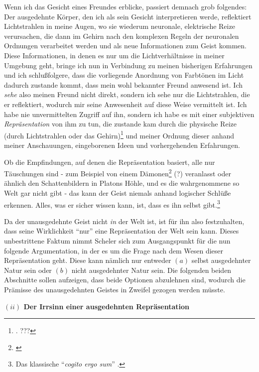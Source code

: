\documentclass[a4paper, 12pt]{article}
\begin{document}
\begin{onehalfspace}
Wenn ich das Gesicht eines Freundes erblicke, passiert demnach grob folgendes: Der ausgedehnte Körper, den ich als sein Gesicht interpretieren werde, reflektiert Lichtstrahlen in meine Augen, wo sie wiederum neuronale, elektrische Reize verursachen, die dann im Gehirn nach den komplexen Regeln der neuronalen Ordnungen verarbeitet werden und als neue Informationen zum Geist kommen. Diese Informationen, in denen es nur um die Lichtverhältnisse in meiner Umgebung geht, bringe ich nun in Verbindung zu meinen bisherigen Erfahrungen und ich schlußfolgere, dass die vorliegende Anordnung von Farbtönen im Licht dadurch zustande kommt, dass mein wohl bekannter Freund anwesend ist. Ich \emph{sehe} also meinen Freund nicht direkt, sondern ich sehe nur die Lichtstrahlen, die er reflektiert, wodurch mir seine Anwesenheit auf diese Weise vermittelt ist. Ich habe nie unvermittelten Zugriff auf ihn, sondern ich habe es mit einer subjektiven \emph{Repräsentation} von ihm zu tun, die zustande kam durch die physische Reize (durch Lichtstrahlen oder das Gehirn)\footnote{\Cite[Vgl.][S. 270f.]{scheler-idole}. ???} und meiner Ordnung dieser anhand meiner Anschauungen, eingeborenen Ideen und vorhergehenden Erfahrungen. 

Ob die Empfindungen, auf denen die Repräsentation basiert, alle nur Täuschungen sind - zum Beispiel von einem Dämonen\footnote{\Cite[Vgl.][S.?]{descartes}} (?) veranlasst oder ähnlich den Schattenbildern in Platons Höhle, und es die wahrgenommene so Welt gar nicht gibt - das kann der Geist niemals anhand logischer Schlüße erkennen. Alles, was er sicher wissen kann, ist, dass es ihn selbst gibt.\footnote{Das klassische "`\emph{cogito ergo sum}"' .} 


Da der unausgedehnte Geist nicht \emph{in} der Welt ist, ist für ihn also festzuhalten, dass seine Wirklichkeit "`nur"' eine Repräsentation der Welt sein kann. Dieses unbestrittene Faktum nimmt Scheler sich zum Ausgangspunkt für die nun folgende Argumentation, in der es um die Frage nach dem Wesen dieser Repräsentation geht. Diese kann nämlich nur entweder $(a)$ selbst ausgedehnter Natur sein oder $(b)$ nicht ausgedehnter Natur sein. Die folgenden beiden Abschnitte sollen aufzeigen, dass beide Optionen abzulehnen sind, wodurch die Prämisse des unausgedehnten Geistes in Zweifel gezogen werden müsste.

\vspace{5mm}
\noindent\textbf{$(ii)$ Der Irrsinn einer ausgedehnten Repräsentation}


\end{onehalfspace}
\end{document}
